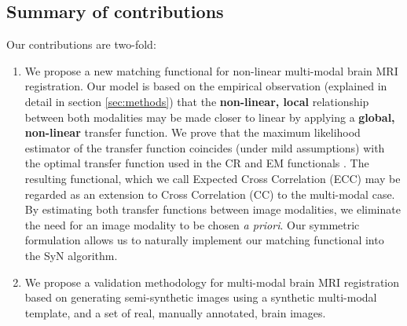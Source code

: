 \subsection{Summary of contributions}
Our contributions are two-fold:
\begin{enumerate}
\item{We propose a new matching functional for non-linear multi-modal brain MRI registration. Our model is based on the empirical observation (explained in detail in section \ref{sec:methods}) that the \textbf{non-linear, local} relationship between both modalities may be made closer to linear by applying a \textbf{global, non-linear} transfer function. We prove that the maximum likelihood estimator of the transfer function coincides (under mild assumptions) with the optimal transfer function used in the CR and EM functionals \cite{Roche1998} \cite{Arce-santana2014} \cite{Ocegueda2015}. The resulting functional, which we call Expected Cross Correlation (ECC) may be regarded as an extension to Cross Correlation (CC) to the multi-modal case. By estimating both transfer functions between image modalities, we eliminate the need for an image modality to be chosen {\it a priori}. Our symmetric formulation allows us to naturally implement our matching functional into the SyN \cite{Avants2011a} algorithm.}
\item{We propose a validation methodology for multi-modal brain MRI registration based on generating semi-synthetic images using a synthetic multi-modal template, and a set of real, manually annotated, brain images.}
\end{enumerate}

